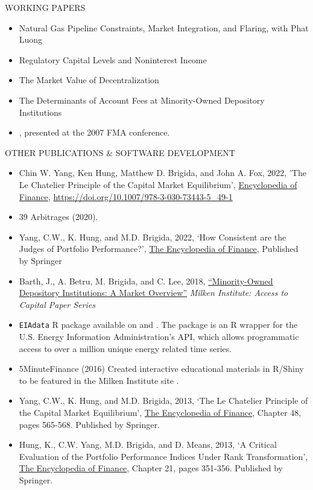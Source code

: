 \documentclass[9pt]{article}
\begin{document}
\vspace{10pt}
WORKING PAPERS
\begin{itemize}[noitemsep, nolistsep]
\item Natural Gas Pipeline Constraints, Market Integration, and Flaring, with Phat Luong
\item Regulatory Capital Levels and Noninterest Income
\item The Market Value of Decentralization
\item The Determinants of Account Fees at Minority-Owned Depository Institutions
\item \href{https://docs.google.com/file/d/0B46EsGCAlLnPdmxsT3ZtVGk5Wkk/edit?usp=sharing}{\color{Blue}{Almost Stochastic Dominance: A Penchant for Risk}}, presented at the 2007 FMA conference.
\end{itemize}
\vspace{10pt}
OTHER PUBLICATIONS \& SOFTWARE DEVELOPMENT
\begin{itemize}[noitemsep, nolistsep]
\item Chin W. Yang, Ken Hung, Matthew D. Brigida, and John A. Fox, 2022, 'The Le Chatelier Principle of the Capital Market Equilibrium', \underline{Encyclopedia of Finance}, \url{https://doi.org/10.1007/978-3-030-73443-5_49-1}
\item 39 Arbitrages (2020).
\item Yang, C.W., K. Hung, and M.D. Brigida, 2022, `How Consistent are the Judges of Portfolio Performance?', \underline{The Encyclopedia of Finance}, Published by Springer
\item Barth, J., A. Betru, M. Brigida, and C. Lee, 2018, \href{https://assets1b.milkeninstitute.org/assets/Publication/ResearchReport/PDF/MDIs-A-Market-Overview-7.18.18-FINAL.pdf}{\color{Blue}``Minority-Owned Depository Institutions: A Market Overview''} {\it Milken Institute: Access to Capital Paper Series}
\item \texttt{EIAdata} R package available on \href{http://cran.r-project.org/package=EIAdata}{\color{Blue}{CRAN (stable)}} and \href{https://github.com/Matt-Brigida/EIAdata}{\color{Blue}{Github (development)}}.  The package is an R wrapper for the U.S. Energy Information Administration's API, which allows programmatic access to over a million unique energy related time series.
\item 5MinuteFinance (2016) Created interactive educational materials in R/Shiny to be featured in the Milken Institute site {\color{blue}{5MinuteFinance.org}}. 
\item Yang, C.W., K. Hung, and M.D. Brigida, 2013, `The Le Chatelier Principle of the Capital Market Equilibrium', \underline{The
Encyclopedia of Finance}, Chapter 48, pages 565-568. Published by Springer.
\item Hung, K., C.W. Yang, M.D. Brigida, and D. Means, 2013, `A Critical Evaluation of the Portfolio Performance
Indices Under Rank Transformation', \underline{The Encyclopedia of Finance}, Chapter 21, pages 351-356. Published by
Springer.
\end{itemize}
\end{document}

